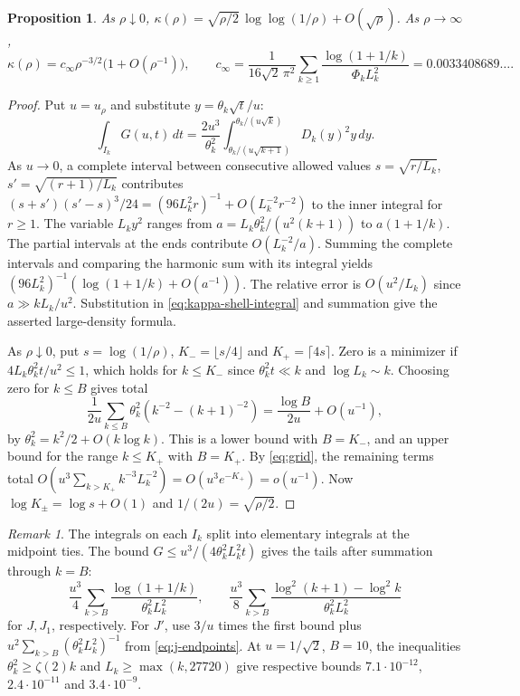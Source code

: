 \documentclass[11pt]{amsart}
\newtheorem{proposition}[theorem]{Proposition}
\theoremstyle{remark}
\newtheorem{remark}[theorem]{Remark}
\begin{document}
\begin{proposition}\label{prop:kappa-endpoints}
As \(\rho\downarrow0\),
\(\kappa(\rho)=\sqrt{\rho/2}\,\log\log(1/\rho)+O(\sqrt\rho)\).
As \(\rho\to\infty\),
\[
 \kappa(\rho)=c_\infty\rho^{-3/2}\bigl(1+O(\rho^{-1})\bigr),\qquad
 c_\infty=\frac{1}{16\sqrt2\,\pi^2}
      \sum_{k\ge1}\frac{\log(1+1/k)}{\Phi_k L_k^2}
      =0.0033408689\ldots .
\]
\end{proposition}
\begin{proof}
Put \(u=u_\rho\) and substitute \(y=\theta_k\sqrt t/u\):
\begin{equation}\label{eq:kappa-shell-integral}
 \int_{I_k}G(u,t)\,dt
 =\frac{2u^3}{\theta_k^2}\int_{\theta_k/(u\sqrt{k+1})}^{\theta_k/(u\sqrt{k})}
      D_k(y)^2y\,dy .
\end{equation}
As \(u\to0\), a complete interval between consecutive allowed values
\(s=\sqrt{r/L_k}\), \(s'=\sqrt{(r+1)/L_k}\) contributes
\((s+s')(s'-s)^3/24=(96L_k^2r)^{-1}+O(L_k^{-2}r^{-2})\)
to the inner integral for \(r\ge1\). The variable \(L_ky^2\) ranges from
\(a=L_k\theta_k^2/(u^2(k+1))\) to \(a(1+1/k)\). The partial intervals
at the ends contribute \(O(L_k^{-2}/a)\). Summing the complete
intervals and comparing the harmonic sum with its integral yields
\((96L_k^2)^{-1}(\log(1+1/k)+O(a^{-1}))\).
The relative error is \(O(u^2/L_k)\) since \(a\gg kL_k/u^2\).
Substitution in \eqref{eq:kappa-shell-integral} and summation give
the asserted large-density formula.

As \(\rho\downarrow0\), put \(s=\log(1/\rho)\),
\(K_-=\lfloor s/4\rfloor\) and \(K_+=\lceil4s\rceil\).
Zero is a minimizer if \(4L_k\theta_k^2t/u^2\le1\), which holds
for \(k\le K_-\) since \(\theta_k^2t\ll k\) and \(\log L_k\sim k\).
Choosing zero for \(k\le B\) gives total
\[
 \frac{1}{2u}\sum_{k\le B}\theta_k^2(k^{-2}-(k+1)^{-2})
 =\frac{\log B}{2u}+O(u^{-1}),
\]
by \(\theta_k^2=k^2/2+O(k\log k)\).
This is a lower bound with \(B=K_-\), and an upper bound for
the range \(k\le K_+\) with \(B=K_+\).
By \eqref{eq:grid}, the remaining terms total
\(O(u^3\sum_{k>K_+}k^{-3}L_k^{-2})=O(u^3e^{-K_+})=o(u^{-1})\).
Now \(\log K_\pm=\log s+O(1)\) and \(1/(2u)=\sqrt{\rho/2}\).
\end{proof}

\begin{remark}
The integrals on each \(I_k\) split into elementary integrals at
the midpoint ties. The bound \(G\le u^3/(4\theta_k^2L_k^2t)\) gives the
tails after summation through \(k=B\):
\[
 \frac{u^3}{4}\sum_{k>B}\frac{\log(1+1/k)}{\theta_k^2L_k^2},
 \qquad
 \frac{u^3}{8}\sum_{k>B}
   \frac{\log^2(k+1)-\log^2 k}{\theta_k^2L_k^2}
\]
for \(J,J_1\), respectively. For \(J'\), use \(3/u\) times the first
bound plus \(u^2\sum_{k>B}(\theta_k^2L_k^2)^{-1}\) from
\eqref{eq:j-endpoints}. At \(u=1/\sqrt2\), \(B=10\), the inequalities
\(\theta_k^2\ge\zeta(2)k\) and \(L_k\ge\max(k,27720)\) give respective
bounds \(7.1\cdot10^{-12}\), \(2.4\cdot10^{-11}\) and \(3.4\cdot10^{-9}\).
\end{remark}
\end{document}
